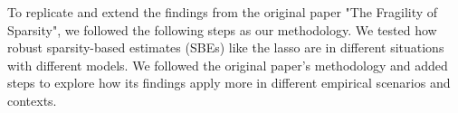 
To replicate and extend the findings from the original paper "The Fragility of Sparsity", we followed the following steps as our methodology. We tested how robust sparsity-based estimates (SBEs) like the lasso are in different situations with different models. We followed the original paper's methodology and added steps to explore how its findings apply more in different empirical scenarios and contexts. 